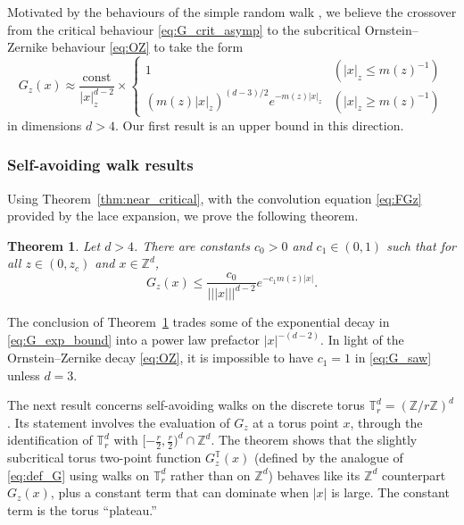\documentclass[11pt,hidelinks]{article}
\theoremstyle{plain}
\newtheorem{theorem}{Theorem}[section]
\numberwithin{equation}{section}
\newcommand{\Z}{\mathbb{Z}}
\newcommand{\T}{\mathbb{T}}
\newcommand{\inv}{^{-1}}
\renewcommand{\(}{\left(}
\renewcommand{\)}{\right)}
\newcommand{\1}{\mathds{1}}
\providecommand{\abs}[1]{\lvert#1\rvert}
\newcommand{\mz}{m(z)}
\newcommand{\supT}{^{ \mathbb{T} }}
\newcommand{\veee}[1]{|\!|\!|#1|\!|\!|}
\providecommand{\nnnorm}[1]{\veee {#1} }
\newcommand{\const}{\mathrm{const}}
\begin{document}
Motivated by the behaviours of the simple random walk \cite{MS22},
we believe the crossover from the critical behaviour \eqref{eq:G_crit_asymp} to the subcritical Ornstein--Zernike behaviour \eqref{eq:OZ} to take the form
\begin{equation}
G_z(x) \approx \frac {\const}{ \abs x_z^{d-2} } \times \begin{cases}
1 & (\abs x_z \le \mz\inv ) \\
( \mz \abs x_z )^{(d-3)/2} e^{-\mz \abs x_z} &(\abs x_z \ge \mz \inv)
\end{cases}
\end{equation}
in dimensions $d > 4$.
Our first result is an upper bound in this direction.





\subsubsection{Self-avoiding walk results}
Using Theorem~\ref{thm:near_critical}, with the convolution equation \eqref{eq:FGz} provided by the lace expansion, we prove the following theorem. 

\begin{theorem}
\label{thm:saw}
Let $d > 4$. 
There are constants $c_0 > 0$ and $c_1 \in (0,1)$ such that for all $z \in (0, z_c)$ and $x\in \Z^d$, 
\begin{equation} \label{eq:G_saw}
G_z(x) \le \frac{ c_0 } { \nnnorm x^{d-2} } e^{-c_1 m(z) \abs x} .
\end{equation}
\end{theorem}

The conclusion of Theorem~\ref{thm:saw} trades some of the exponential decay in \eqref{eq:G_exp_bound} into a power law prefactor $\abs x^{-(d-2)}$. In light of the Ornstein--Zernike decay \eqref{eq:OZ}, it is impossible to have $c_1 = 1$ in \eqref{eq:G_saw} unless $d=3$. 

The next result concerns self-avoiding walks on the discrete torus $\T^d_r = (\Z / r\Z)^d$. 
Its statement involves the evaluation of $G_z$ at a torus point $x$, through the identification of $\T^d_r$ with $[ - \frac r 2, \frac r 2 )^d \cap \Z^d$.
The theorem shows that the slightly subcritical torus two-point function $G_z\supT(x)$ (defined by the analogue of \eqref{eq:def_G} using walks on $\T^d_r$ rather than on $\Z^d$) behaves like its $\Z^d$ counterpart $G_z(x)$, plus a constant term that can dominate when $\abs x$ is large. 
The constant term is the torus ``plateau.'' 
\end{document}
